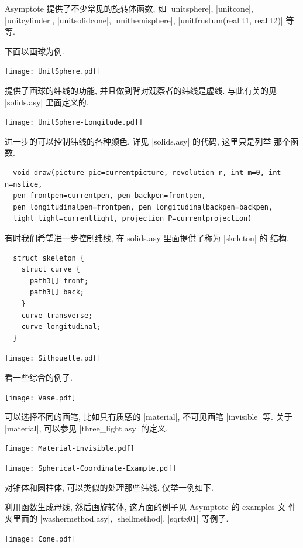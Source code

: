 \documentclass[nofonts,CJKnormalspaces]{ctexbook}
\begin{document}
Asymptote 提供了不少常见的旋转体函数, 如 |unitsphere|, |unitcone|,
|unitcylinder|, |unitsolidcone|, |unithemisphere|,
|unitfrustum(real t1, real t2)| 等等.

下面以画球为例.
\begin{center}\texttt{[image: UnitSphere.pdf]}\end{center}%

提供了画球的纬线的功能, 并且做到背对观察者的纬线是虚线.
与此有关的见 |solids.asy| 里面定义的.
\begin{center}\texttt{[image: UnitSphere-Longitude.pdf]}\end{center}%

进一步的可以控制纬线的各种颜色, 详见 |solids.asy| 的代码, 这里只是列举
那个函数.
\begin{lstlisting}
  void draw(picture pic=currentpicture, revolution r, int m=0, int n=nslice,
  pen frontpen=currentpen, pen backpen=frontpen,
  pen longitudinalpen=frontpen, pen longitudinalbackpen=backpen,
  light light=currentlight, projection P=currentprojection)
\end{lstlisting}
有时我们希望进一步控制纬线, 在 solids.asy 里面提供了称为 |skeleton| 的
结构.
\begin{lstlisting}
  struct skeleton {
    struct curve {
      path3[] front;
      path3[] back;
    }
    curve transverse;
    curve longitudinal;
  }
\end{lstlisting}
\begin{center}\texttt{[image: Silhouette.pdf]}\end{center}%

看一些综合的例子.
\begin{center}\texttt{[image: Vase.pdf]}\end{center}%

可以选择不同的画笔, 比如具有质感的 |material|, 不可见画笔 |invisible|
等. 关于 |material|, 可以参见 |three_light.asy| 的定义.
\begin{center}\texttt{[image: Material-Invisible.pdf]}\end{center}%

\begin{center}\texttt{[image: Spherical-Coordinate-Example.pdf]}\end{center}%

对锥体和圆柱体, 可以类似的处理那些纬线. 仅举一例如下.

利用函数生成母线, 然后画旋转体, 这方面的例子见 Asymptote 的 examples 文
件夹里面的 |washermethod.asy|, |shellmethod|, |sqrtx01| 等例子.
\begin{center}\texttt{[image: Cone.pdf]}\end{center}%

\end{document}
